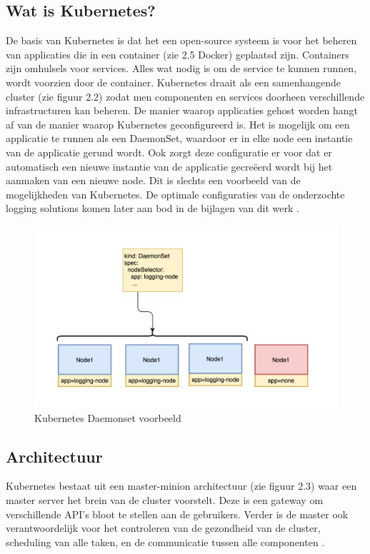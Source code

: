 \subsection{Wat is Kubernetes?}
De basis van Kubernetes is dat het een open-source systeem is voor het beheren van applicaties die in een container (zie 2.5 Docker) geplaatsd zijn. Containers zijn omhulsels voor services. Alles wat nodig is om de service te kunnen runnen, wordt voorzien door de container. Kubernetes draait als een samenhangende cluster (zie figuur 2.2) zodat men  componenten en services doorheen verschillende infrastructuren kan beheren. De manier waarop applicaties gehost worden hangt af van de manier waarop Kubernetes geconfigureerd is. Het is mogelijk om een applicatie te runnen als een DaemonSet, waardoor er in elke node een instantie van de applicatie gerund wordt. Ook zorgt deze configuratie er voor dat er automatisch een nieuwe instantie van de applicatie gecreëerd wordt bij het aanmaken van een nieuwe node. Dit is slechts een voorbeeld van de mogelijkheden van Kubernetes. De optimale configuraties van de onderzochte logging solutions komen later aan bod in de bijlagen van dit werk \autocite{ellingwood2018}.

\begin{figure}[ht]
    \centering
    \includegraphics[scale=0.4]{img/kubernetes_daemonset}
    \caption[Kubernetes DaemonSet voorbeeld]{Kubernetes Daemonset voorbeeld \cite{techstories2017}}
\end{figure}

\subsection{Architectuur}
Kubernetes bestaat uit een master-minion architectuur (zie figuur 2.3) waar een master server het brein van de cluster voorstelt. Deze is een gateway om verschillende API's bloot te stellen aan de gebruikers. Verder is de master ook verantwoordelijk voor het controleren van de gezondheid van de cluster, scheduling van alle taken, en de communicatie tussen alle componenten \autocite{ellingwood2018}.

